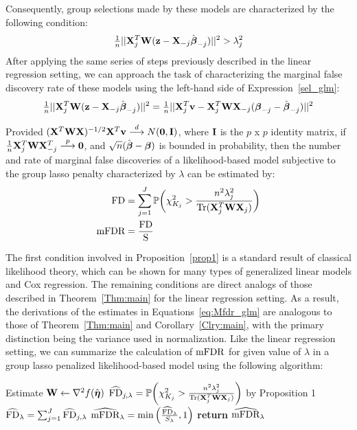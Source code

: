 Consequently, group selections made by these models are characterized by the following condition:
\begin{equation}
\label{eq:sel_glm}
\tfrac{1}{n}||\mathbf{X}_j^T\mathbf{W}(\mathbf{z} - \mathbf{X}_{-j}\hat{\boldsymbol{\beta}}_{-j})||^2 > \lambda_j^2
\end{equation}
After applying the same series of steps previously described in the linear regression setting, we can approach the task of characterizing the marginal false discovery rate of these models using the left-hand side of Expression~\ref{sel_glm}:
\begin{equation}
\label{eq:Mfdr_proof_glm}
\tfrac{1}{n}||\mathbf{X}_j^T\mathbf{W}(\mathbf{z} - \mathbf{X}_{-j}\hat{\boldsymbol{\beta}}_{-j})||^2 = \tfrac{1}{n}||\mathbf{X}_j^T\mathbf{v} - \mathbf{X}_j^T\mathbf{W}\mathbf{X}_{-j}(\boldsymbol{\beta}_{-j} - \hat{\boldsymbol{\beta}}_{-j})||^2 
\end{equation}

\begin{prop}
\label{prop1}
Provided $(\mathbf{X}^T\mathbf{W}\mathbf{X})^{-1/2}\mathbf{X}^T\mathbf{v} \overset{d}{\longrightarrow} N(\mathbf{0}, \mathbf{I})$, where $\mathbf{I}$ is the $p$ x $p$ identity matrix, if $\tfrac{1}{n}\mathbf{X}_j^T \mathbf{W} \mathbf{X}_{-j}^T \overset{p}{\longrightarrow} \mathbf{0}$, and $\sqrt{n}(\hat{\boldsymbol{\beta}}- \boldsymbol{\beta})$ is bounded in probability, then the number and rate of marginal false discoveries of a likelihood-based model subjective to the group lasso penalty characterized by $\lambda$ can be estimated by:
\begin{align}
\label{eq:Mfdr_glm}
\begin{alignedat}{2}
\textrm{FD} &= \sum_{j = 1}^{J} \mathbb{P} \bigg(\chi^2_{K_j} > \frac{n^2\lambda_j^2}{\operatorname{Tr}(\mathbf{X}_j^T\mathbf{W}\mathbf{X}_j)}\bigg)\\
\textrm{mFDR} &= \frac{\textrm{FD}}{\text{S}} 
\end{alignedat}
\end{align}
\end{prop}

The first condition involved in Proposition~\ref{prop1} is a standard result of classical likelihood theory, which can be shown for many types of generalized linear models and Cox regression. The remaining conditions are direct analogs of those described in Theorem~\ref{Thm:main} for the linear regression setting. As a result, the derivations of the estimates in Equations~\ref{eq:Mfdr_glm} are analogous to those of Theorem~\ref{Thm:main} and Corollary~\ref{Clry:main}, with the primary distinction being the variance used in normalization. 
Like the linear regression setting, we can summarize the calculation of $\textrm{mFDR}$ for given value of $\lambda$ in a group lasso penalized likelihood-based model using the following algorithm:

\begin{algorithm*}
\caption{Calculating the mFDR upper bound (GLMs}\label{Alg:mfdr_glm}
\begin{algorithmic}[10]
\Procedure{}{}
\State Estimate $\mathbf{W} \gets \nabla^2f(\hat{\boldsymbol{\eta}})$
\State $\widehat{\textrm{FD}}_{j, \lambda} = \mathbb{P} \bigg(\chi^2_{K_j} > \frac{n^2\lambda_j^2}{\operatorname{Tr}(\mathbf{X}_j^T\mathbf{W}\mathbf{X}_j)}\bigg)$ by Proposition 1
\EndFor
\State $\widehat{\textrm{FD}}_\lambda = \sum_{j=1}^{J} \widehat{\textrm{FD}}_{j, \lambda} $
\State $\widehat{\textrm{mFDR}}_\lambda = \text{min}\left(\frac{\widehat{\textrm{FD}}_\lambda}{S_\lambda}, 1 \right)$
\EndProcedure
\State \textbf{return} $\widehat{\textrm{mFDR}}_\lambda $
\end{algorithmic}
\end{algorithm*}

